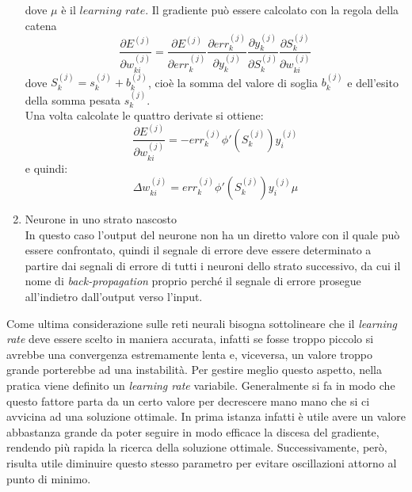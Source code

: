 \begin{enumerate}
\begin{equation}
	\end{equation}
	dove $\mu$ è il $\textit{learning rate}$.
	Il gradiente può essere calcolato con la regola della catena 
	\begin{equation}
	\frac{\partial E^{(j)} }{\partial w_{ki}^{(j)}} = \frac{\partial E^{(j)}}{\partial err_k^{(j)}}
	\frac{\partial err_k^{(j)}}{\partial y_k^{(j)}}
	\frac{\partial y_k^{(j)}}{\partial S_k^{(j)}}
	\frac{\partial S_k^{(j)}}{\partial w_{ki}^{(j)}}
	\end{equation}
	dove $S_k^{(j)} = s_k^{(j)} + b_k^{(j)}$, cioè la somma del valore di soglia $b_k^{(j)}$ e dell'esito della somma pesata $s_k^{(j)}$. \\
	Una volta calcolate le quattro derivate si ottiene:
	\begin{equation}
	\frac{\partial E^{(j)} }{\partial w_{ki}^{(j)}} =
	-err_k^{(j)}\phi'(S_k^{(j)})y_i^{(j)}
	\end{equation}
	e quindi:
	\begin{equation}
	\Delta w_{ki}^{(j)} = err_k^{(j)}\phi'(S_k^{(j)})y_i^{(j)} \mu
	\end{equation}
	
	\item Neurone in uno strato nascosto \\
	In questo caso l'output del neurone non ha un diretto valore con il quale può essere confrontato, quindi il segnale di errore deve essere determinato a partire dai segnali di errore di tutti i neuroni dello strato successivo, da cui il nome di \textit{back-propagation} proprio perché il segnale di errore prosegue all'indietro dall'output verso l'input.
\end{enumerate}
Come ultima considerazione sulle reti neurali bisogna sottolineare che il \textit{learning rate} deve essere scelto in maniera accurata, infatti se fosse troppo piccolo si avrebbe una convergenza estremamente lenta e, viceversa, un valore troppo grande porterebbe ad una instabilità. Per gestire meglio questo aspetto, nella pratica viene definito un \textit{learning rate} variabile. Generalmente si fa in modo che questo fattore parta da un certo valore per decrescere mano mano che si ci avvicina ad una soluzione ottimale. In prima istanza infatti è utile avere un valore abbastanza grande da poter seguire in modo efficace la discesa del gradiente, rendendo più rapida la ricerca della soluzione ottimale. Successivamente, però, risulta utile diminuire questo stesso parametro per evitare oscillazioni attorno al punto di minimo.

\newpage

